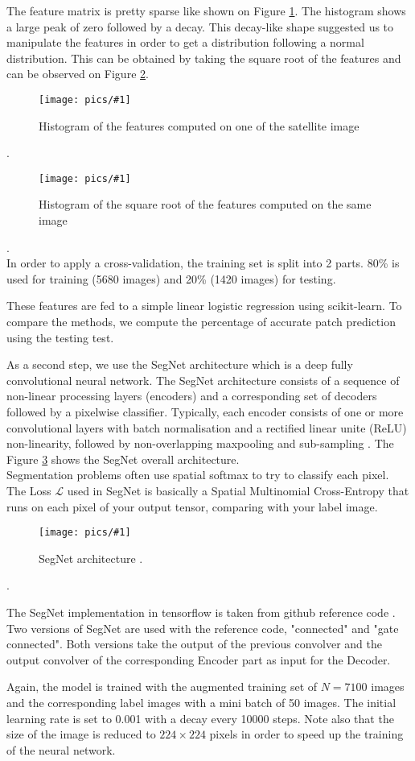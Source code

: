 \documentclass[10pt,conference,compsocconf]{IEEEtran}
\newcommand{\scalefig}[4]{
  \begin{figure}[ht!]
    \centering
    \texttt{[image: pics/\#1]}
 \caption{#3}
    \label{#4}
  \end{figure}}
\newcommand{\Lagr}{\mathcal{L}}
\begin{document}
The feature matrix is pretty sparse like shown on Figure \ref{fig:hist_feats}. The histogram shows a large peak of zero followed by a decay. This decay-like shape suggested us to manipulate the features in order to get a distribution following a normal distribution. This can be obtained by taking the square root of the features and can be observed on Figure \ref{fig:hist_sqrt_feats}.
\scalefig{hist_feats}{1}{Histogram of the features computed on one of the satellite image}{fig:hist_feats}.\\
\scalefig{hist_sqrt_feats}{1}{Histogram of the square root of the features computed on the same image}{fig:hist_sqrt_feats}.\\

In order to apply a cross-validation, the training set is split into 2 parts. 80\%  is used for training (5680 images) and 20\% (1420 images) for testing. 

These features are fed to a simple linear logistic regression using scikit-learn. To compare the methods, we compute the percentage of accurate patch prediction using the testing test.

As a second step, we use the SegNet architecture which is a deep fully convolutional neural network. The SegNet architecture consists of a sequence of non-linear processing layers (encoders) and a corresponding set of decoders followed by a pixelwise classifier. Typically, each encoder consists of one or more convolutional layers with batch normalisation and a rectified linear unite (ReLU) non-linearity, followed by non-overlapping maxpooling and sub-sampling  \cite{segnet2}. The Figure \ref{fig:segnet_arch} shows the SegNet overall architecture.\\
Segmentation problems often use spatial softmax to try to classify each pixel. The Loss $\Lagr$ used in SegNet is basically a Spatial Multinomial Cross-Entropy that runs on each pixel of your output tensor, comparing with your label image.

\scalefig{segnet}{1}{SegNet architecture \cite{segnet2}.}{fig:segnet_arch}.

The SegNet implementation in tensorflow is taken from github reference code \cite{leo}. Two versions of SegNet are used with the reference code, "connected" and "gate connected". Both versions take the output of the previous convolver and the output convolver of the corresponding Encoder part as input for the Decoder. 
 
Again, the model is trained with the augmented training set of $N=7100$ images and the corresponding label images with a mini batch of 50 images. The initial learning rate is set to 0.001 with a decay every 10000 steps. Note also that the size of the image is reduced to $224 \times 224$ pixels in order to speed up the training of the neural network.
\end{document}
